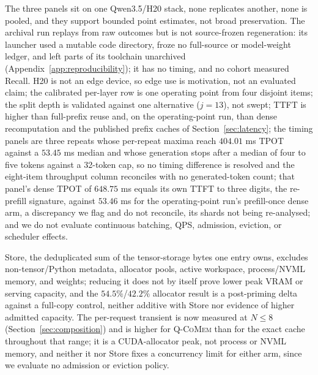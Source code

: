 \documentclass{article}
\newcommand{\qcomem}{\textsc{Q-CoMem}}
\begin{document}
The three panels sit on one Qwen3.5/H20 stack, none replicates another, none is
pooled, and they support bounded point estimates, not broad preservation.  The
archival run replays from raw outcomes but is not
source-frozen regeneration: its launcher used a mutable code directory, froze no
full-source or model-weight ledger, and left parts of its toolchain unarchived
(Appendix~\ref{app:reproducibility}); it has no timing, and no cohort measured
Recall.  H20 is not an edge device, so edge use is motivation, not an evaluated
claim; the calibrated per-layer row is one operating point from four disjoint
items; the split depth is validated against one alternative ($j=13$), not swept;
TTFT is higher than full-prefix reuse and, on the operating-point run, than
dense recomputation and the published prefix caches of
Section~\ref{sec:latency}; the timing panels are three repeats whose per-repeat
maxima reach $404.01$ ms TPOT against a $53.45$ ms median and whose generation
stops after a median of four to five tokens against a 32-token cap, so no timing
difference is resolved and the eight-item throughput column reconciles with no
generated-token count; that panel's dense TPOT of $648.75$ ms equals its own TTFT
to three digits, the re-prefill signature, against $53.46$ ms for the
operating-point run's prefill-once dense arm, a discrepancy we flag and do not
reconcile, its shards not being re-analysed; and we do not evaluate continuous
batching, QPS, admission, eviction, or scheduler effects.

Store, the deduplicated sum of the tensor-storage bytes one entry owns, excludes
non-tensor/Python metadata, allocator pools, active workspace, process/NVML
memory, and weights; reducing it does not by itself prove lower peak VRAM or
serving capacity, and the $54.5\%$/$42.2\%$ allocator result is a post-priming
delta against a full-copy control, neither additive with Store nor evidence of
higher admitted capacity.  The per-request transient is now measured at $N\leq8$
(Section~\ref{sec:composition}) and is higher for \qcomem{} than for the exact
cache throughout that range; it is a CUDA-allocator peak, not process or NVML
memory, and neither it nor Store fixes a concurrency limit for either arm,
since we evaluate no admission or eviction policy.
\end{document}
